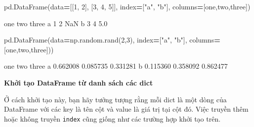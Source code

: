\documentclass[
]{book}
\newenvironment{Shaded}{\begin{snugshade}}{\end{snugshade}}
\newcommand{\DecValTok}[1]{\textcolor[rgb]{0.00,0.00,0.81}{#1}}
\newcommand{\FloatTok}[1]{\textcolor[rgb]{0.00,0.00,0.81}{#1}}
\newcommand{\NormalTok}[1]{#1}
\newcommand{\OperatorTok}[1]{\textcolor[rgb]{0.81,0.36,0.00}{\textbf{#1}}}
\newcommand{\StringTok}[1]{\textcolor[rgb]{0.31,0.60,0.02}{#1}}
\begin{document}
\begin{Shaded}
\begin{Highlighting}[]
\NormalTok{pd.DataFrame(data}\OperatorTok{=}\NormalTok{[[}\DecValTok{1}\NormalTok{, }\DecValTok{2}\NormalTok{], [}\DecValTok{3}\NormalTok{, }\DecValTok{4}\NormalTok{, }\DecValTok{5}\NormalTok{]], }
\NormalTok{                     index}\OperatorTok{=}\NormalTok{[}\StringTok{"a"}\NormalTok{, }\StringTok{"b"}\NormalTok{], }
\NormalTok{                     columns}\OperatorTok{=}\NormalTok{[}\StringTok{\textquotesingle{}one\textquotesingle{}}\NormalTok{,}\StringTok{\textquotesingle{}two\textquotesingle{}}\NormalTok{,}\StringTok{\textquotesingle{}three\textquotesingle{}}\NormalTok{])}
\end{Highlighting}
\end{Shaded}

\begin{Shaded}
\begin{Highlighting}[]
\NormalTok{   one  two  three}
\NormalTok{a    }\DecValTok{1}    \DecValTok{2}\NormalTok{    NaN}
\NormalTok{b    }\DecValTok{3}    \DecValTok{4}    \FloatTok{5.0}

\NormalTok{pd.DataFrame(data}\OperatorTok{=}\NormalTok{np.random.rand(}\DecValTok{2}\NormalTok{,}\DecValTok{3}\NormalTok{), }
\NormalTok{                     index}\OperatorTok{=}\NormalTok{[}\StringTok{"a"}\NormalTok{, }\StringTok{"b"}\NormalTok{], }
\NormalTok{                     columns}\OperatorTok{=}\NormalTok{[}\StringTok{\textquotesingle{}one\textquotesingle{}}\NormalTok{,}\StringTok{\textquotesingle{}two\textquotesingle{}}\NormalTok{,}\StringTok{\textquotesingle{}three\textquotesingle{}}\NormalTok{]))}
\end{Highlighting}
\end{Shaded}

\begin{Shaded}
\begin{Highlighting}[]
\NormalTok{        one       two     three}
\NormalTok{a  }\FloatTok{0.662008}  \FloatTok{0.085735}  \FloatTok{0.331281}
\NormalTok{b  }\FloatTok{0.115360}  \FloatTok{0.358092}  \FloatTok{0.862477}
\end{Highlighting}
\end{Shaded}

\textbf{Khởi tạo DataFrame từ danh sách các dict}

Ở cách khởi tạo này, bạn hãy tưởng tượng rằng mỗi dict là một dòng của DataFrame với các key là tên
cột và value là giá trị tại cột đó. Việc truyền thêm hoặc không truyền \texttt{index} cũng giống
như các trường hợp khởi tạo trên.
\end{document}
